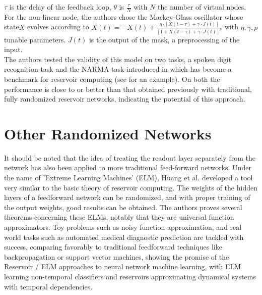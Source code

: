 \documentclass[12pt,oneside]{CUNY_CS_PhD}
\begin{document}
$\tau$ is the delay of the feedback loop, $\theta$ is $\frac{\tau}{N}$ with $N$ the number of virtual nodes. For the non-linear node, the authors chose the Mackey-Glass oscillator whose state$X$ evolves according to $\dot X (t) = -X(t) + \frac{\eta \cdot [X(t-\tau) + \gamma \cdot J(t)]}{[1+X(t-\tau) + \gamma \cdot J(t)]^p }$ with $\eta, \gamma, p$ tunable parameters. $J(t)$ is the output of the mask, a preprocessing of the input.\\
The authors tested the validity of this model on two tasks, a spoken digit recognition task and the NARMA task introduced in \cite{atiya2000new} which has become a benchmark for reservoir computing (see \cite{lukosevicius_survey:_2009} for an example). On both the performance is close to or better than that obtained previously with traditional, fully randomized reservoir networks, indicating the potential of this approach.

\section{Other Randomized Networks}
It should be noted that the idea of treating the readout layer separately from the network has also been applied to more traditional feed-forward networks. Under the name of 'Extreme Learning Machines' (ELM), Huang et al. \cite{huang_extreme_2006,huang_extreme_2011} developed a tool very similar to the basic theory of reservoir computing. The weights of the hidden layers of a feedforward network can be randomized, and with proper training of the output weights, good results can be obtained. The authors proves several theorems concerning these ELMs, notably that they are universal function approximators. Toy problems such as noisy function approximation, and real world tasks such as automated medical diagnostic prediction are tackled with success, comparing favorably to traditional feedforward techniques like backpropagation or support vector machines, showing the promise of the Reservoir / ELM approaches to neural network machine learning, with ELM learning non-temporal classifiers and reservoirs approximating dynamical systems with temporal dependencies.
\end{document}
